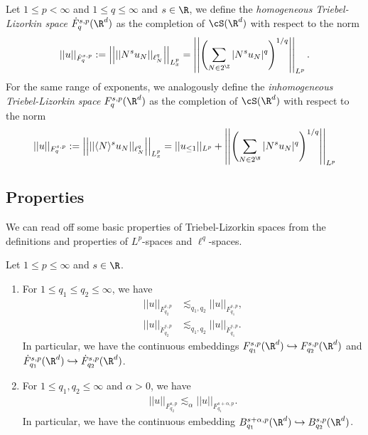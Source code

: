 Let $1 \leq p < \infty$ and $1 \leq q \leq \infty$ and $s \in \R$, we define the \emph{homogeneous Triebel-Lizorkin space} $\dot F^{s, p}_q (\R^d)$ as the completion of $\cS (\R^d)$ with respect to the norm 
	\[ ||u||_{\dot F^{s, p}_q} := \left|\left| || N^s u_N ||_{\ell^q_N} \right|\right|_{L^p_x} = \left|\left| \left( \sum_{N \in 2^\Z} |N^s u_N|^q \right)^{1/q} \right|\right|_{L^p}. \]	
For the same range of exponents, we analogously define the \emph{inhomogeneous Triebel-Lizorkin space} $F^{s, p}_q (\R^d)$ as the completion of $\cS (\R^d)$ with respect to the norm 	
	\[ ||u||_{F^{s, p}_q} := \left|\left| || \langle N\rangle ^s u_N ||_{\ell^q_N} \right|\right|_{L^p_x} = ||u_{\leq 1}||_{L^p} + \left|\left| \left( \sum_{N \in 2^\N} |N^s u_N|^q \right)^{1/q} \right|\right|_{L^p} \]	

\subsection{Properties}
We can read off some basic properties of Triebel-Lizorkin spaces from the definitions and properties of $L^p$-spaces and $\ell^q$-spaces. 

\begin{proposition}
	Let $1 \leq p \leq \infty$ and $s \in \R$. 
\begin{enumerate}
	\item For $1 \leq q_1 \leq q_2 \leq \infty$, we have
			\begin{align*}
				||u||_{F^{s, p}_{q_2}} 
					&\lesssim_{q_1, q_2} ||u||_{F^{s, p}_{q_1}},\\
				||u||_{\dot F^{s, p}_{q_2}} 
					&\lesssim_{q_1, q_2} ||u||_{\dot F^{s, p}_{q_1}}.
			\end{align*}
		In particular, we have the continuous embeddings $F^{s, p}_{q_1} (\R^d) \hookrightarrow F^{s, p}_{q_2} (\R^d)$ and $\dot F^{s, p}_{q_1} (\R^d) \hookrightarrow \dot F^{s, p}_{q_2} (\R^d)$. 
	
	\item For $1 \leq q_1, q_2 \leq \infty$ and $\alpha > 0$, we have
			\begin{align*}
				||u||_{F^{s, p}_{q_2}} \lesssim_\alpha ||u||_{F^{s + \alpha, p}_{q_1}}.
			\end{align*}
		In particular, we have the continuous embedding $B^{s + \alpha, p}_{q_1} (\R^d) \hookrightarrow B^{s, p}_{q_2} (\R^d)$.
\end{enumerate}\label{prop:basicembedtriebel}	
\end{proposition}

